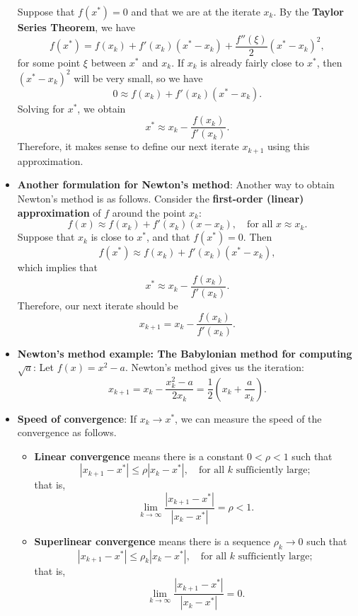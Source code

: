 \documentclass{report}
\begin{document}
\begin{itemize}
    Suppose that $f(x^*) = 0$ and that we are at the iterate $x_k$. By the \textbf{Taylor Series Theorem}, we have
    $$
    f(x^*) = f(x_k) + f'(x_k)(x^* - x_k) + \frac{f''(\xi)}{2}(x^* - x_k)^2,
    $$
    for some point $\xi$ between $x^*$ and $x_k$. If $x_k$ is already fairly close to $x^*$, then $(x^* - x_k)^2$ will be very small, so we have
    $$0 \approx f(x_k) + f'(x_k)(x^* - x_k).$$
    Solving for $x^*$, we obtain
    $$x^* \approx x_k - \frac{f(x_k)}{f'(x_k)}.$$
    Therefore, it makes sense to define our next iterate $x_{k+1}$ using this approximation.
\item \textbf{Another formulation for Newton's method}:
    Another way to obtain Newton's method is as follows. Consider the \textbf{first-order (linear) approximation} of $f$ around the point $x_k$:
    $$f(x) \approx f(x_k) + f'(x_k)(x - x_k), \quad \text{for all $x \approx x_k$}.$$
    Suppose that $x_k$ is close to $x^*$, and that $f(x^*) = 0$. Then
    $$f(x^*) \approx f(x_k) + f'(x_k)(x^* - x_k),$$
    which implies that
    $$x^* \approx x_k - \frac{f(x_k)}{f'(x_k)}.$$
    Therefore, our next iterate should be 
    $$x_{k+1} = x_k - \frac{f(x_k)}{f'(x_k)}.$$
\item \textbf{Newton's method example: The Babylonian method for computing $\sqrt{a}$}:
    Let $f(x) = x^2 - a$. Newton's method gives us the iteration:
$$ x_{k+1} = x_k - \frac{x_k^2 - a}{2x_k} = \frac{1}{2}\left(x_k + \frac{a}{x_k}\right).$$
\item \textbf{Speed of convergence}:
    If \( x_k \to x^* \), we can measure the speed of the convergence as follows.
    \begin{itemize}
        \item  \textbf{Linear convergence} means there is a constant \( 0 < \rho < 1 \) such that
        \[
            \left|x_{k+1}-x^*\right| \leq \rho \left|x_k - x^*\right|, \quad \text{for all } k \text{ sufficiently large};
        \]
        that is,
        \[
            \lim_{k \to \infty} \frac{\left|x_{k+1}-x^*\right|}{\left|x_k - x^*\right|} = \rho < 1.
        \]

        \item \textbf{Superlinear convergence} means there is a sequence \( \rho_k \to 0 \) such that
        \[
            \left|x_{k+1}-x^*\right| \leq \rho_k \left|x_k - x^*\right|, \quad \text{for all } k \text{ sufficiently large};
        \]
        that is,
        \[
            \lim_{k \to \infty} \frac{\left|x_{k+1}-x^*\right|}{\left|x_k - x^*\right|} = 0.
        \]


\end{itemize}
\end{itemize}
\end{document}
